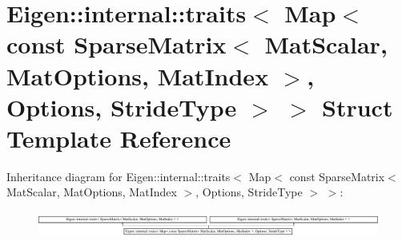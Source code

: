 \hypertarget{struct_eigen_1_1internal_1_1traits_3_01_map_3_01const_01_sparse_matrix_3_01_mat_scalar_00_01_matec7066c11e5361dce6e4102c84e4bcd2}{}\section{Eigen\+:\+:internal\+:\+:traits$<$ Map$<$ const Sparse\+Matrix$<$ Mat\+Scalar, Mat\+Options, Mat\+Index $>$, Options, Stride\+Type $>$ $>$ Struct Template Reference}
\label{struct_eigen_1_1internal_1_1traits_3_01_map_3_01const_01_sparse_matrix_3_01_mat_scalar_00_01_matec7066c11e5361dce6e4102c84e4bcd2}
Inheritance diagram for Eigen\+:\+:internal\+:\+:traits$<$ Map$<$ const Sparse\+Matrix$<$ Mat\+Scalar, Mat\+Options, Mat\+Index $>$, Options, Stride\+Type $>$ $>$\+:\begin{figure}[H]
\begin{center}
\leavevmode
\includegraphics[height=0.857580cm]{struct_eigen_1_1internal_1_1traits_3_01_map_3_01const_01_sparse_matrix_3_01_mat_scalar_00_01_matec7066c11e5361dce6e4102c84e4bcd2}
\end{center}
\end{figure}
